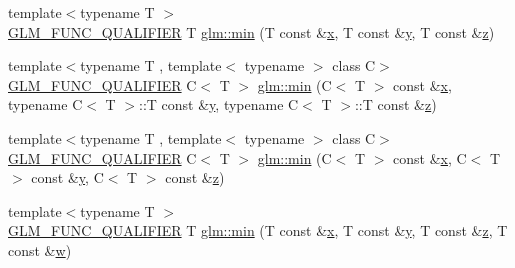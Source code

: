 \begin{DoxyCompactItemize}
\item 
{\footnotesize template$<$typename T $>$ }\\\mbox{\hyperlink{setup_8hpp_a33fdea6f91c5f834105f7415e2a64407}{G\+L\+M\+\_\+\+F\+U\+N\+C\+\_\+\+Q\+U\+A\+L\+I\+F\+I\+ER}} T \mbox{\hyperlink{group__gtx__extended__min__max_ga713d3f9b3e76312c0d314e0c8611a6a6}{glm\+::min}} (T const \&\mbox{\hyperlink{_s_d_l__opengl_8h_ad0e63d0edcdbd3d79554076bf309fd47}{x}}, T const \&\mbox{\hyperlink{_s_d_l__opengl_8h_a1675d9d7bb68e1657ff028643b4037e3}{y}}, T const \&\mbox{\hyperlink{_s_d_l__opengl__glext_8h_a5e74030ebb3297ce1b37ff716fedd68f}{z}})
\item 
{\footnotesize template$<$typename T , template$<$ typename $>$ class C$>$ }\\\mbox{\hyperlink{setup_8hpp_a33fdea6f91c5f834105f7415e2a64407}{G\+L\+M\+\_\+\+F\+U\+N\+C\+\_\+\+Q\+U\+A\+L\+I\+F\+I\+ER}} C$<$ T $>$ \mbox{\hyperlink{group__gtx__extended__min__max_ga74d1a96e7cdbac40f6d35142d3bcbbd4}{glm\+::min}} (C$<$ T $>$ const \&\mbox{\hyperlink{_s_d_l__opengl_8h_ad0e63d0edcdbd3d79554076bf309fd47}{x}}, typename C$<$ T $>$\+::T const \&\mbox{\hyperlink{_s_d_l__opengl_8h_a1675d9d7bb68e1657ff028643b4037e3}{y}}, typename C$<$ T $>$\+::T const \&\mbox{\hyperlink{_s_d_l__opengl__glext_8h_a5e74030ebb3297ce1b37ff716fedd68f}{z}})
\item 
{\footnotesize template$<$typename T , template$<$ typename $>$ class C$>$ }\\\mbox{\hyperlink{setup_8hpp_a33fdea6f91c5f834105f7415e2a64407}{G\+L\+M\+\_\+\+F\+U\+N\+C\+\_\+\+Q\+U\+A\+L\+I\+F\+I\+ER}} C$<$ T $>$ \mbox{\hyperlink{group__gtx__extended__min__max_ga42b5c3fc027fd3d9a50d2ccc9126d9f0}{glm\+::min}} (C$<$ T $>$ const \&\mbox{\hyperlink{_s_d_l__opengl_8h_ad0e63d0edcdbd3d79554076bf309fd47}{x}}, C$<$ T $>$ const \&\mbox{\hyperlink{_s_d_l__opengl_8h_a1675d9d7bb68e1657ff028643b4037e3}{y}}, C$<$ T $>$ const \&\mbox{\hyperlink{_s_d_l__opengl__glext_8h_a5e74030ebb3297ce1b37ff716fedd68f}{z}})
\item 
{\footnotesize template$<$typename T $>$ }\\\mbox{\hyperlink{setup_8hpp_a33fdea6f91c5f834105f7415e2a64407}{G\+L\+M\+\_\+\+F\+U\+N\+C\+\_\+\+Q\+U\+A\+L\+I\+F\+I\+ER}} T \mbox{\hyperlink{group__gtx__extended__min__max_ga95466987024d03039607f09e69813d69}{glm\+::min}} (T const \&\mbox{\hyperlink{_s_d_l__opengl_8h_ad0e63d0edcdbd3d79554076bf309fd47}{x}}, T const \&\mbox{\hyperlink{_s_d_l__opengl_8h_a1675d9d7bb68e1657ff028643b4037e3}{y}}, T const \&\mbox{\hyperlink{_s_d_l__opengl__glext_8h_a5e74030ebb3297ce1b37ff716fedd68f}{z}}, T const \&\mbox{\hyperlink{_s_d_l__opengl__glext_8h_a6ee8f168a7ab6785a9bb57c6715dad99}{w}})

\end{DoxyCompactItemize}
